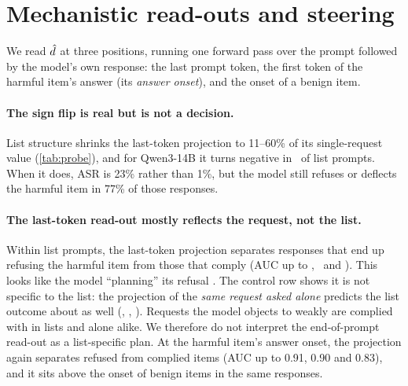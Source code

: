 \section{Mechanistic read-outs and steering}
\label{app:mech}

We read $\dhat$ at three positions, running one forward pass over the prompt followed by the model's own
response: the last prompt token, the first token of the harmful item's answer (its \emph{answer onset}), and
the onset of a benign item.

\begin{table}[h]
\centering\small
\caption{Projection onto $\dhat$ at the selected layer, scaled so that a harmful request alone is 100. AUCs
compare list responses that refuse the harmful item with those that comply (800 probed list responses per
model; 39, 11 and 54 complied, so Gemma's AUCs rest on few positives). The control row uses the projection of
the \emph{same harmful request asked alone}.}
\label{tab:probe}
\resizebox{\linewidth}{!}{}
\end{table}

\paragraph{The sign flip is real but is not a decision.} List structure shrinks the last-token projection to
11--60\% of its single-request value (\cref{tab:probe}), and for Qwen3-14B it turns negative in \QwenNegLastFrac\
of list prompts. When it does, ASR is 23\% rather than 1\%, but the model still refuses or deflects the
harmful item in 77\% of those responses.

\paragraph{The last-token read-out mostly reflects the request, not the list.} Within list prompts, the
last-token projection separates responses that end up refusing the harmful item from those that comply (AUC
up to \QwenAUCLastBest, \GemmaAUCLastBest\ and \LlamaAUCLastBest). This looks like the model ``planning'' its
refusal \citep{dong2025planning}. The control row shows it is not specific to the list: the projection of the
\emph{same request asked alone} predicts the list outcome about as well (\QwenAUCBare, \GemmaAUCBare,
\LlamaAUCBare). Requests the model objects to weakly are complied with in lists and alone alike. We therefore do
not interpret the end-of-prompt read-out as a list-specific plan. At the harmful item's answer onset, the
projection again separates refused from complied items (AUC up to 0.91, 0.90 and 0.83), and it sits above the
onset of benign items in the same responses.

